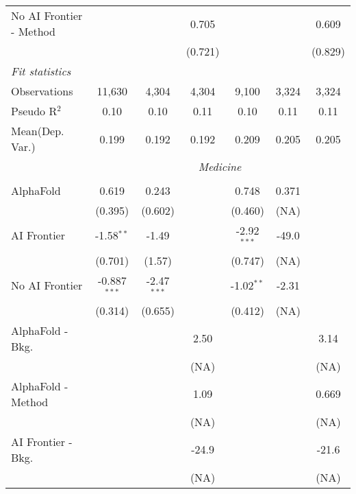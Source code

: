 \begin{tabular}{lcccccc}
   No AI Frontier - Method &               &             & 0.705        &               &             & 0.609\\   
                           &               &             & (0.721)      &               &             & (0.829)\\   
   \midrule
   \emph{Fit statistics}\\
   Observations            & 11,630        & 4,304       & 4,304        & 9,100         & 3,324       & 3,324\\  
   Pseudo R$^2$            & 0.10          & 0.10        & 0.11         & 0.10          & 0.11        & 0.11\\  
   
Mean(Dep. Var.) & 0.199 & 0.192 & 0.192 & 0.209 & 0.205 & 0.205 \\
 & \multicolumn{6}{c}{\textit{Medicine}} \\ \\
   AlphaFold               & 0.619          & 0.243         &        & 0.748         & 0.371 &   \\   
                           & (0.395)        & (0.602)       &        & (0.460)       & (NA)  &   \\   
   AI Frontier             & -1.58$^{**}$   & -1.49         &        & -2.92$^{***}$ & -49.0 &   \\   
                           & (0.701)        & (1.57)        &        & (0.747)       & (NA)  &   \\   
   No AI Frontier          & -0.887$^{***}$ & -2.47$^{***}$ &        & -1.02$^{**}$  & -2.31 &   \\   
                           & (0.314)        & (0.655)       &        & (0.412)       & (NA)  &   \\   
   AlphaFold - Bkg.        &                &               & 2.50   &               &       & 3.14\\   
                           &                &               & (NA)   &               &       & (NA)\\   
   AlphaFold - Method      &                &               & 1.09   &               &       & 0.669\\   
                           &                &               & (NA)   &               &       & (NA)\\   
   AI Frontier - Bkg.      &                &               & -24.9  &               &       & -21.6\\   
                           &                &               & (NA)   &               &       & (NA)\\   

\end{tabular}
